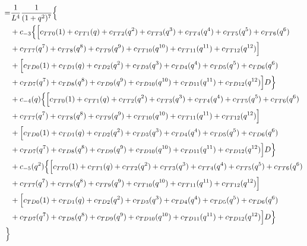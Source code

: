 \documentclass[12pt]{article}
\begin{document}
\begin{align}
    =& \frac{1}{L^4} \frac{1}{(1+q^2)^7} \Bigl\{ \nonumber\\
    &+ c_{-3}\Bigl\{ \Bigl[ c_{TT0}(1) + c_{TT1}(q) + c_{TT2}(q^2) + c_{TT3}(q^3) + c_{TT4}(q^4) + c_{TT5}(q^5) + c_{TT6}(q^6) \nonumber\\
    &+ c_{TT7}(q^7) + c_{TT8}(q^8) + c_{TT9}(q^9) + c_{TT10}(q^{10}) + c_{TT11}(q^{11}) + c_{TT12}(q^{12}) \Bigr] \nonumber\\
    &+ \Bigl[ c_{TD0}(1) + c_{TD1}(q) + c_{TD2}(q^2) + c_{TD3}(q^3) + c_{TD4}(q^4) + c_{TD5}(q^5) + c_{TD6}(q^6) \nonumber\\
    &+ c_{TD7}(q^7) + c_{TD8}(q^8) + c_{TD9}(q^9) + c_{TD10}(q^{10}) + c_{TD11}(q^{11}) + c_{TD12}(q^{12}) \Bigr]D \Bigr\}  \nonumber\\
    &+ c_{-4}(q)\Bigl\{ \Bigl[ c_{TT0}(1) + c_{TT1}(q) + c_{TT2}(q^2) + c_{TT3}(q^3) + c_{TT4}(q^4) + c_{TT5}(q^5) + c_{TT6}(q^6) \nonumber\\
    &+ c_{TT7}(q^7) + c_{TT8}(q^8) + c_{TT9}(q^9) + c_{TT10}(q^{10}) + c_{TT11}(q^{11}) + c_{TT12}(q^{12}) \Bigr] \nonumber\\
    &+ \Bigl[ c_{TD0}(1) + c_{TD1}(q) + c_{TD2}(q^2) + c_{TD3}(q^3) + c_{TD4}(q^4) + c_{TD5}(q^5) + c_{TD6}(q^6) \nonumber\\
    &+ c_{TD7}(q^7) + c_{TD8}(q^8) + c_{TD9}(q^9) + c_{TD10}(q^{10}) + c_{TD11}(q^{11}) + c_{TD12}(q^{12}) \Bigr]D \Bigr\}  \nonumber\\
    &+ c_{-5}(q^2)\Bigl\{ \Bigl[ c_{TT0}(1) + c_{TT1}(q) + c_{TT2}(q^2) + c_{TT3}(q^3) + c_{TT4}(q^4) + c_{TT5}(q^5) + c_{TT6}(q^6) \nonumber\\
    &+ c_{TT7}(q^7) + c_{TT8}(q^8) + c_{TT9}(q^9) + c_{TT10}(q^{10}) + c_{TT11}(q^{11}) + c_{TT12}(q^{12}) \Bigr] \nonumber\\
    &+ \Bigl[ c_{TD0}(1) + c_{TD1}(q) + c_{TD2}(q^2) + c_{TD3}(q^3) + c_{TD4}(q^4) + c_{TD5}(q^5) + c_{TD6}(q^6) \nonumber\\
    &+ c_{TD7}(q^7) + c_{TD8}(q^8) + c_{TD9}(q^9) + c_{TD10}(q^{10}) + c_{TD11}(q^{11}) + c_{TD12}(q^{12}) \Bigr]D \Bigr\}  \nonumber\\
    \Bigr\}
\end{align}
\end{document}
